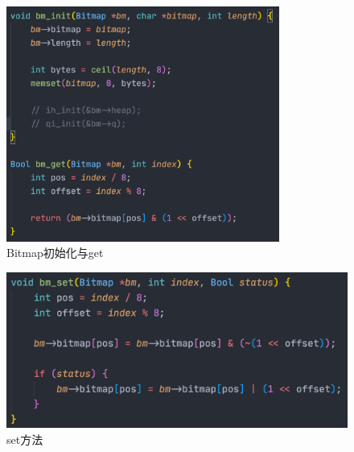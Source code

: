 \begin{figure}[H]
    \centering
    \includegraphics[width=0.8\textwidth]{figures/bm1.png}
    \caption{Bitmap初始化与get}
    \label{fig:my_label}
\end{figure}

\begin{figure}[H]
    \centering
    \includegraphics[width=\textwidth]{figures/bm2.png}
    \caption{set方法}
    \label{fig:my_label}
\end{figure}

